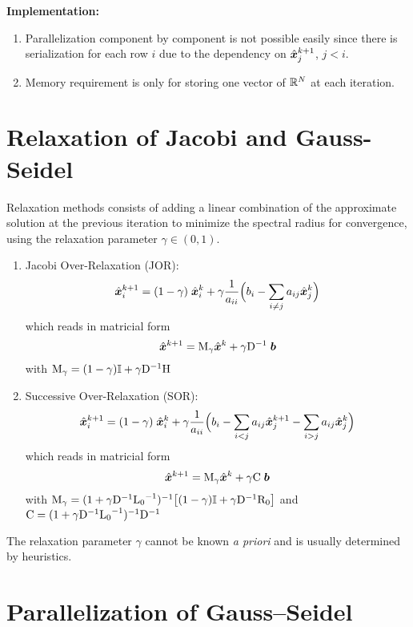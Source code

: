 \medskip
\textbf{Implementation:}
\begin{enumerate}
\item Parallelization component by component is not possible easily since there is serialization for each row $i$ due to the dependency on $\hat{\boldsymbol x}_j^{k+1}$, $j < i$.
\item Memory requirement is only for storing one vector of ${\mathbb{R}^N}$ at each iteration.
\end{enumerate}


\section{Relaxation of Jacobi and Gauss-Seidel}

Relaxation methods consists of adding a linear combination of the approximate solution at the previous iteration to minimize the spectral radius for convergence, using the relaxation parameter $\gamma \in (0,1)$.

\medskip
\begin{enumerate}
\item Jacobi Over-Relaxation (JOR):
\begin{equation}
\hat{\boldsymbol x}^{k+1}_i = (1 - \gamma)\;\hat{\boldsymbol x}^{k}_i + \gamma \frac{1}{a_{ii}}\Bigl( b_i - \sum_{i\neq j} a_{ij} \hat{\boldsymbol x}^{k}_j \Bigr)
\end{equation}
which reads in matricial form
\[
\hat{\boldsymbol x}^{k+1} = {\mathrm M}_\gamma \hat{\boldsymbol x}^{k} + \gamma{\mathrm D}^{-1}\;{\boldsymbol b}
\]
with ${\mathrm M}_\gamma = (1-\gamma){\mathbf{\mathbb{I}}} + \gamma{\mathrm D}^{-1} {\mathrm H}$

\medskip
\item Successive Over-Relaxation (SOR):
\begin{equation}
\hat{\boldsymbol x}^{k+1}_i = (1-\gamma)\;\hat{\boldsymbol x}^{k}_i + \gamma \frac{1}{a_{ii}}\Bigl( b_i - \sum_{i < j} a_{ij} \hat{\boldsymbol x}^{k+1}_j - \sum_{i > j} a_{ij} \hat{\boldsymbol x}^{k}_j \Bigr)
\end{equation}
which reads in matricial form
\[
\hat{\boldsymbol x}^{k+1} = {\mathrm M}_\gamma \hat{\boldsymbol x}^{k} + \gamma{\mathrm C}\;{\boldsymbol b}
\]
with ${\mathrm M}_\gamma = (1 + \gamma{\mathrm D}^{-1}{\mathrm L_0}^{-1} )^{-1} \bigl[(1-\gamma){\mathbf{\mathbb{I}}} + \gamma{\mathrm D}^{-1} {\mathrm R_0} \bigr]$ and ${\mathrm C} = (1 + \gamma{\mathrm D}^{-1}{\mathrm L_0}^{-1} )^{-1} {\mathrm D}^{-1}$
\end{enumerate}

\medskip
The relaxation parameter $\gamma$ cannot be known \textit{a priori} and is usually determined by heuristics.

\section{Parallelization of Gauss--Seidel}

